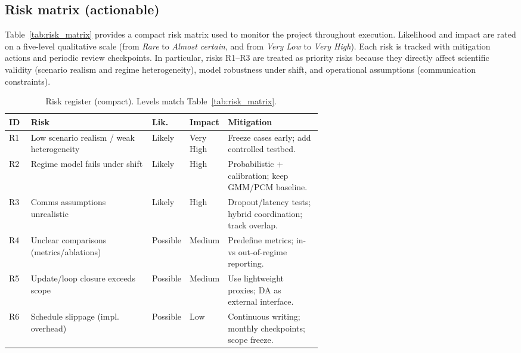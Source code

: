 \subsection{Risk matrix (actionable)}
Table~\ref{tab:risk_matrix} provides a compact risk matrix used to monitor the project throughout execution. Likelihood and impact are rated on a five-level qualitative scale
(from \emph{Rare} to \emph{Almost certain}, and from \emph{Very Low} to \emph{Very High}). Each risk is tracked with mitigation actions and periodic review checkpoints.
In particular, risks R1--R3 are treated as priority risks because they directly affect scientific validity (scenario realism and regime heterogeneity),
model robustness under shift, and operational assumptions (communication constraints).


\begin{table}[H]
  \centering
  \caption{Risk register (compact). Levels match Table~\ref{tab:risk_matrix}.}
  \label{tab:risk_register}
  \scriptsize
  \renewcommand{\arraystretch}{1.12}
  \setlength{\tabcolsep}{4pt}
  \begin{tabularx}{\linewidth}{C{0.07\linewidth} X C{0.12\linewidth} C{0.12\linewidth} L{0.30\linewidth}}
    \hline
    \textbf{ID} & \textbf{Risk} & \textbf{Lik.} & \textbf{Impact} & \textbf{Mitigation} \\
    \hline
    R1 & Low scenario realism / weak heterogeneity & Likely   & Very High & Freeze cases early; add controlled testbed. \\
    R2 & Regime model fails under shift            & Likely   & High      & Probabilistic + calibration; keep GMM/PCM baseline. \\
    R3 & Comms assumptions unrealistic             & Likely   & High      & Dropout/latency tests; hybrid coordination; track overlap. \\
    R4 & Unclear comparisons (metrics/ablations)   & Possible & Medium    & Predefine metrics; in- vs out-of-regime reporting. \\
    R5 & Update/loop closure exceeds scope         & Possible & Medium    & Use lightweight proxies; DA as external interface. \\
    R6 & Schedule slippage (impl. overhead)        & Possible & Low       & Continuous writing; monthly checkpoints; scope freeze. \\
    \hline
  \end{tabularx}
\end{table}

